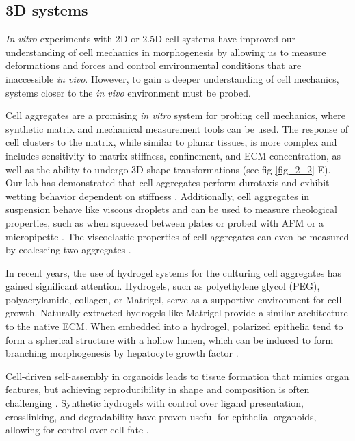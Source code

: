 \hypertarget{d-systems}{%
\subsection{3D systems}\label{d-systems}}

\textit{In vitro} experiments with 2D or 2.5D cell systems have improved our understanding of cell mechanics in morphogenesis by allowing us to measure deformations and forces and control environmental conditions that are inaccessible \textit{in vivo}. However, to gain a deeper understanding of cell mechanics, systems closer to the \textit{in vivo} environment must be probed.

Cell aggregates are a promising \textit{in vitro} system for probing cell mechanics, where synthetic matrix and mechanical measurement tools can be used. The response of cell clusters to the matrix, while similar to planar tissues, is more complex and includes sensitivity to matrix stiffness, confinement, and ECM concentration, as well as the ability to undergo 3D shape transformations (see fig \ref{fig_2_2} E). Our lab has demonstrated that cell aggregates perform durotaxis and exhibit wetting behavior dependent on stiffness \cite{perez-gonzalez2019, pallares2022}. Additionally, cell aggregates in suspension behave like viscous droplets and can be used to measure rheological properties, such as when squeezed between plates or probed with AFM or a micropipette \cite{xi2018}. The viscoelastic properties of cell aggregates can even be measured by coalescing two aggregates
\cite{oriola2022}.

In recent years, the use of hydrogel systems for the culturing cell aggregates has gained significant attention. Hydrogels, such as polyethylene glycol (PEG), polyacrylamide, collagen, or Matrigel, serve as a supportive environment for cell growth. Naturally extracted hydrogels like Matrigel provide a similar architecture to the native ECM. When embedded into a hydrogel, polarized epithelia tend to form a spherical structure with a hollow lumen, which can be induced to form branching morphogenesis by hepatocyte growth factor \cite{bryant2008}. 

Cell-driven self-assembly in organoids leads to tissue formation that mimics organ features, but achieving reproducibility in shape and composition is often challenging \cite{nelson2008, hofer2021}. Synthetic hydrogels with control over ligand presentation, crosslinking, and degradability have proven useful for epithelial organoids, allowing for control over cell fate \cite{gjorevski2016, gjorevski2022}.

